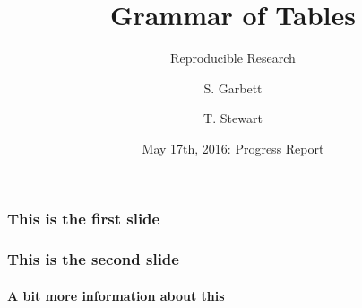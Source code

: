 \documentclass{beamer}
\begin{document}
  
  \title[Grammar of Tables]{Grammar of Tables}
  \subtitle{Reproducible Research}
  \author[S. Garbett, T. Stewart]{S. Garbett \and T. Stewart}
  \date[]{May 17th, 2016: Progress Report}
  
  \frame{\titlepage}
  \begin{frame}
    \frametitle{This is the first slide}
  \end{frame}
  \begin{frame}
    \frametitle{This is the second slide}
    \framesubtitle{A bit more information about this}
  \end{frame}
\end{document}

